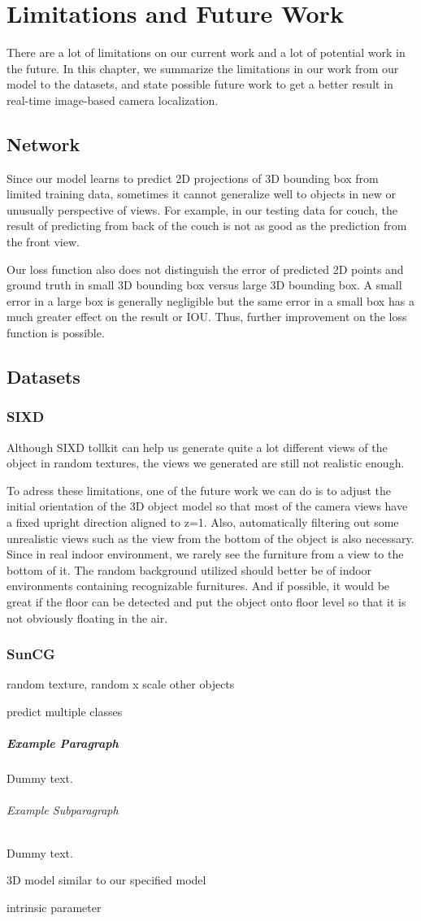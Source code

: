 \chapter{Limitations and Future Work}

There are a lot of limitations on our current work and a lot of potential work in the future. In this chapter, we summarize the limitations in our work from our model to the datasets, and state possible future work to get a better result in real-time image-based camera localization.

\section{Network}
Since our model learns to predict 2D projections of 3D bounding box from limited training data, sometimes it cannot generalize well to objects in new or unusually perspective of views. For example, in our testing data for couch, the result of predicting from back of the couch is not as good as the prediction from the front view.

Our loss function also does not distinguish the error of predicted 2D points and ground truth in small 3D bounding box versus large 3D bounding box. A small error in a large box is generally negligible but the same error in a small box has a much greater effect on the result or IOU. Thus, further improvement on the loss function is possible.

\section{Datasets}
\subsection{SIXD}
\label{sec:SIXD}
Although SIXD tollkit can help us generate quite a lot different views of the object in random textures, the views we generated are still not realistic enough.

To adress these limitations, one of the future work we can do is to adjust the initial orientation of the 3D object model so that most of the camera views have a fixed upright direction aligned to z=1. Also, automatically filtering out some unrealistic views such as the view from the bottom of the object is also necessary. Since in real indoor environment, we rarely see the furniture from a view to the bottom of it. The random background utilized should better be of indoor environments containing recognizable furnitures. And if possible, it would be great if the floor can be detected and put the object onto floor level so that it is not obviously floating in the air.

\subsection{SunCG}
random texture, random x scale
other objects

predict multiple classes


\paragraph{Example Paragraph}

Dummy text.

\subparagraph{Example Subparagraph}

Dummy text.


3D model similar to our specified model

 intrinsic parameter